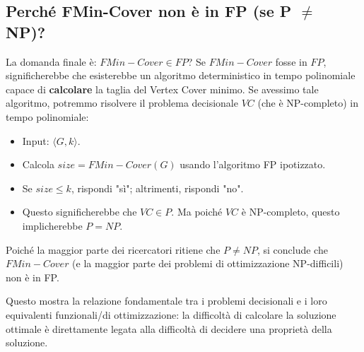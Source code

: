 \documentclass[a4paper]{article}
\theoremstyle{definition} %
\begin{document}
\subsection{Perché FMin-Cover non è in FP (se P $\neq$ NP)?}
La domanda finale è: $FMin-Cover \in FP$?
Se $FMin-Cover$ fosse in $FP$, significherebbe che esisterebbe un algoritmo deterministico in tempo polinomiale capace di \textbf{calcolare} la taglia del Vertex Cover minimo.
Se avessimo tale algoritmo, potremmo risolvere il problema decisionale $VC$ (che è NP-completo) in tempo polinomiale:
\begin{itemize}
    \item Input: $\langle G, k \rangle$.
    \item Calcola $size = FMin-Cover(G)$ usando l'algoritmo FP ipotizzato.
    \item Se $size \le k$, rispondi "sì"; altrimenti, rispondi "no".
\item Questo significherebbe che $VC \in P$. Ma poiché $VC$ è NP-completo, questo implicherebbe $P=NP$.
\end{itemize}
Poiché la maggior parte dei ricercatori ritiene che $P \neq NP$, si conclude che $FMin-Cover$ (e la maggior parte dei problemi di ottimizzazione NP-difficili) non è in FP.

Questo mostra la relazione fondamentale tra i problemi decisionali e i loro equivalenti funzionali/di ottimizzazione: la difficoltà di calcolare la soluzione ottimale è direttamente legata alla difficoltà di decidere una proprietà della soluzione.
\end{document}
